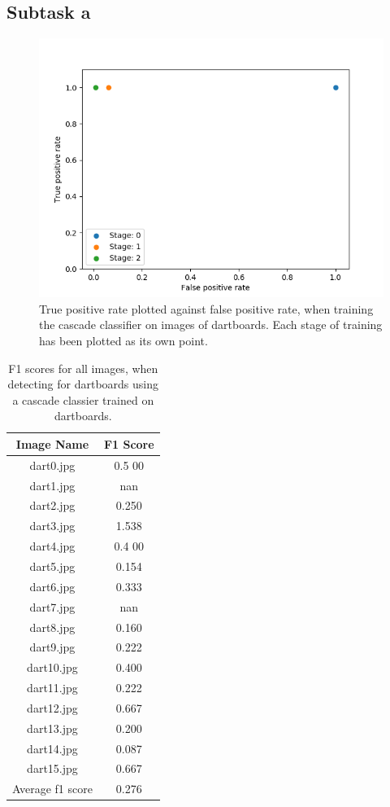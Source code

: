\documentclass[conference]{IEEEtran}
\begin{document}
\subsection{Subtask a}
\begin{figure}[htbp]
\begin{center}
\includegraphics[width=\linewidth]{images/TPRvsFPR}
\caption{True positive rate plotted against false positive rate, when training the cascade classifier on images of dartboards. Each stage of training has been plotted as its own point.}
\label{default}
\end{center}
\end{figure}

\begin{table}[htp]
\caption{F1 scores for all images, when detecting for dartboards using a cascade classier trained on dartboards.}
\begin{center}
\begin{tabular}{||c|c||}
\hline
Image Name 		& F1 Score 	\\ \hline
dart0.jpg			& 0.5	00		\\
dart1.jpg			& nan		\\
dart2.jpg			& 0.250		\\
dart3.jpg			& 1.538		\\
dart4.jpg			& 0.4	00		\\
dart5.jpg			& 0.154		\\
dart6.jpg			& 0.333		\\
dart7.jpg			& nan		\\
dart8.jpg			& 0.160		\\
dart9.jpg			& 0.222		\\
dart10.jpg			& 0.400		\\
dart11.jpg			& 0.222		\\
dart12.jpg			& 0.667		\\
dart13.jpg			& 0.200		\\
dart14.jpg			& 0.087		\\
dart15.jpg			& 0.667		\\ \hline
Average f1 score 	& 0.276		\\ \hline
\end{tabular}
\end{center}
\label{default}
\end{table}%
\newpage
\end{document}
